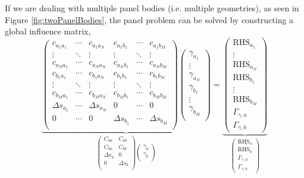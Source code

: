 If we are dealing with multiple panel bodies (i.e. multiple geometries), as seen in Figure \ref{fig:twoPanelBodies}, the panel problem can be solved by constructing a global influence matrix, 
	\begin{equation}
	\underbrace{\begin{pmatrix}
		c_{a_1a_1} & \cdots & c_{a_1a_N} & c_{a_1b_1} &\cdots & c_{a_1b_M}\\
		\vdots & \ddots & \vdots & \vdots &\ddots & \vdots\\
		c_{a_Na_1} & \cdots & c_{a_Na_N} & c_{a_Nb_1} &\cdots & c_{a_Nb_M}\\
		c_{b_1a_1} & \cdots & c_{b_1a_N} & c_{b_1b_1} &\cdots & c_{b_1b_M}\\
		\vdots & \ddots & \vdots & \vdots &\ddots & \vdots\\
		c_{b_Ma_1} & \cdots & c_{b_Ma_N} & c_{b_Mb_1} &\cdots & c_{b_Mb_M}\\
		\Delta s_{a_1} & \cdots & \Delta s_{a_N} & 0 & \cdots & 0\\
		0 & \cdots & 0 & \Delta s_{b_1} & \cdots & \Delta s_{b_M}\\
	\end{pmatrix}
	\begin{pmatrix}
		\gamma_{a_1}\\
		\vdots\\
		\gamma_{a_N}\\
		\gamma_{b_1}\\
		\vdots\\
		\gamma_{b_M}\\
	\end{pmatrix}}_{\begin{pmatrix}
						C_{aa} & C_{ab} \\
						C_{ba} & C_{bb} \\
						\Delta s_a & 0\\
						0 & \Delta s_b \\
					\end{pmatrix} \begin{pmatrix}
								\gamma_{a}\\
								\gamma_{b}\\
							\end{pmatrix}} 
	= 
	\underbrace{\begin{pmatrix}
		\mathrm{RHS}_{a_1}\\
		\vdots\\
		\mathrm{RHS}_{a_N}\\
		\mathrm{RHS}_{b_1}\\
		\vdots\\
		\mathrm{RHS}_{b_M}\\
		\Gamma_{\gamma,a}\\	
	\Gamma_{\gamma,b}
	\end{pmatrix}}_{ 
			\begin{pmatrix}
				\mathrm{RHS}_{a}\\
				\mathrm{RHS}_{b}\\
				\Gamma_{\gamma,a}\\	
				\Gamma_{\gamma,b}
			\end{pmatrix}}
	\end{equation}

